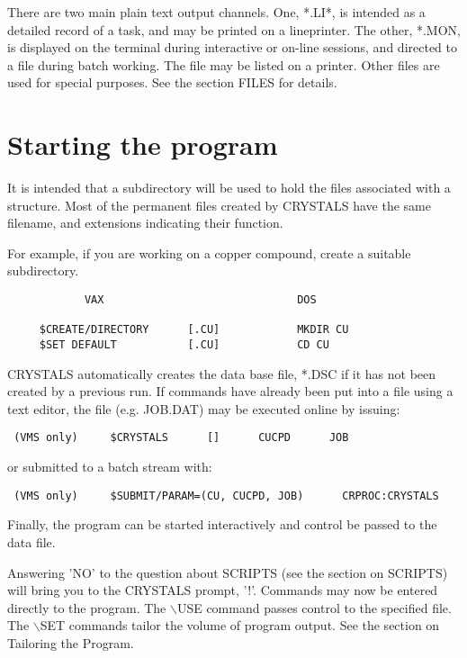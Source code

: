 \documentclass[10pt,a4paper]{report}
\begin{document}
There are two main plain text output channels. One, *.LI*, is
 intended as a detailed record of a task, and may be printed on a
 lineprinter. The other, *.MON, is displayed on the terminal during
 interactive or on-line sessions, and directed to a file during batch
 working. The file may be listed on a printer.
 Other files are used for special purposes. See the section FILES
 for details.




\section{Starting the program}


It is intended that a subdirectory will be used to hold the files associated
 with a structure. Most of the permanent files created by
 CRYSTALS have the same  filename, and extensions indicating their
 function.


For example, if you are working on a copper compound, create a suitable
 subdirectory.

\small\begin{verbatim}
            VAX                              DOS

     $CREATE/DIRECTORY      [.CU]            MKDIR CU
     $SET DEFAULT           [.CU]            CD CU
\end{verbatim}\normalsize




CRYSTALS automatically creates
 the data base file, *.DSC if it has not been created by a previous run.
 If commands have already been put into a file using a text editor, the
 file (e.g. JOB.DAT) may be executed online by issuing:

\small\begin{verbatim}
 (VMS only)     $CRYSTALS      []      CUCPD      JOB
\end{verbatim}\normalsize


 or submitted to a batch stream with:

\small\begin{verbatim}
 (VMS only)     $SUBMIT/PARAM=(CU, CUCPD, JOB)      CRPROC:CRYSTALS
\end{verbatim}\normalsize




Finally, the program can be started interactively and control be
 passed to the data file.


Answering 'NO' to the question about SCRIPTS (see the section on SCRIPTS)
 will bring you to the
 CRYSTALS prompt, '!'. Commands may now be entered directly to the program. The
 $\backslash$USE command passes control to the specified file. The $\backslash$SET commands tailor
 the volume of program output. See the section on Tailoring the Program.
\end{document}
